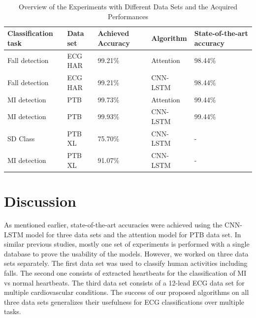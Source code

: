 \documentclass{ieeeaccess}
\newcommand{\todo}[1]{\textbf{\ \textcolor{red}{#1}}}
\begin{document}
\begin{table}[!ht]
    \centering%
    \caption{Overview of the Experiments with Different Data Sets and the
Acquired Performances}
    \label{tbl:overview}
    \small
    \begin{tabular}{*{5}{p{}}}
          \toprule
    \textbf{Classification task} &\textbf{Data set} &  \textbf{Achieved Accuracy} &\textbf{Algorithm} &\textbf{State-of-the-art accuracy}
      \\\midrule
     Fall detection & ECG HAR  & 99.21\% & Attention & 98.44\% \cite{2021}\\
     Fall detection & ECG HAR  & 99.21\% & CNN-LSTM & 98.44\%\cite{2021}\\
     MI detection & PTB  & 99.73\% & Attention & 99.44\%\cite{10.1007/978-3-030-64610-3_40}  \\
     MI detection & PTB  & 99.93\% & CNN-LSTM & 99.44\%\cite{10.1007/978-3-030-64610-3_40} \\
    SD Class & PTB XL & 75.70\% & CNN-LSTM & - \\
     MI detection & PTB XL & 91.07\% & CNN-LSTM & -\\
      
      
     \bottomrule
    \end{tabular}
\end{table}
\section{Discussion}
As mentioned earlier, state-of-the-art accuracies were achieved using the CNN-LSTM model for three data sets and the attention model for PTB data set. In similar previous studies, mostly one set of experiments is performed with a single database to prove the usability of the models. However, we worked on three data sets separately. The first data set was used to classify human activities including falls. The second one consists of extracted heartbeats for the classification of MI vs normal heartbeats. The third data set consists of a 12-lead ECG data set for multiple cardiovascular conditions. The success of our proposed algorithms on all three data sets generalizes their usefulness for ECG classifications over multiple tasks.
\end{document}
